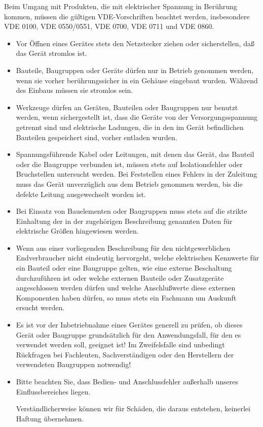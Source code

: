 \documentclass[fleqn,10pt]{SelfArx} %
\begin{document}
Beim Umgang mit Produkten, die mit elektrischer Spannung in Berührung kommen, müssen die gültigen VDE-Vorschriften beachtet werden, insbesondere VDE 0100, VDE 0550/0551, VDE 0700, VDE 0711 und VDE 0860.
\begin{itemize}[noitemsep] %
\item Vor Öffnen eines Gerätes stets den Netzstecker ziehen oder sicherstellen, daß das Gerät stromlos ist.
\item Bauteile, Baugruppen oder Geräte dürfen nur in Betrieb genommen werden, wenn sie vorher berührungssicher in ein Gehäuse eingebaut wurden. Während des Einbaus müssen sie stromlos sein.
\item Werkzeuge dürfen an Geräten, Bauteilen oder Baugruppen nur benutzt werden, wenn sichergestellt ist, dass die Geräte von der Versorgungsspannung getrennt sind und elektrische Ladungen, die in den im Gerät befindlichen Bauteilen gespeichert sind, vorher entladen wurden.
\item Spannungsführende Kabel oder Leitungen, mit denen das Gerät, das Bauteil oder die Baugruppe verbunden ist, müssen stets auf Isolationsfehler oder Bruchstellen untersucht werden. Bei Feststellen eines Fehlers in der Zuleitung muss das Gerät unverzüglich aus dem Betrieb genommen werden, bis die defekte Leitung ausgewechselt worden ist.
\item Bei Einsatz von Bauelementen oder Baugruppen muss stets auf die strikte Einhaltung der in der zugehörigen Beschreibung genannten Daten für elektrische Größen hingewiesen werden.
\item Wenn aus einer vorliegenden Beschreibung für den nichtgewerblichen Endverbraucher nicht eindeutig hervorgeht, welche elektrischen Kennwerte für ein Bauteil oder eine Baugruppe gelten, wie eine externe Beschaltung durchzuführen ist oder welche externen Bauteile oder Zusatzgeräte angeschlossen werden dürfen und welche Anschlußwerte diese externen Komponenten haben dürfen, so muss stets ein Fachmann um Auskunft ersucht werden.
\item Es ist vor der Inbetriebnahme eines Gerätes generell zu prüfen, ob dieses Gerät oder Baugruppe grundsätzlich für den Anwendungsfall, für den es verwendet werden soll, geeignet ist! Im Zweifelsfalle sind unbedingt Rückfragen bei Fachleuten, Sachverständigen oder den Herstellern der verwendeten Baugruppen notwendig!
\item Bitte beachten Sie, dass Bedien- und Anschlussfehler außerhalb unseres Einflussbereiches liegen. \par Verständlicherweise können wir für Schäden, die daraus entstehen, keinerlei Haftung übernehmen.

\end{itemize}
\end{document}
